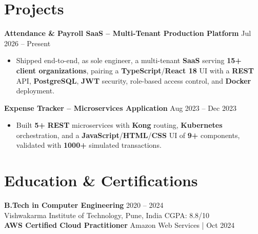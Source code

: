 \documentclass[a4paper,10pt]{article}
\begin{document}
\section*{Projects}

\textbf{Attendance \& Payroll SaaS -- Multi-Tenant Production Platform} \hfill Jul 2026 -- Present
\begin{itemize}[leftmargin=*]
    \item Shipped end-to-end, as sole engineer, a multi-tenant \textbf{SaaS} serving \textbf{15+ client organizations}, pairing a \textbf{TypeScript}/\textbf{React 18} UI with a \textbf{REST} API, \textbf{PostgreSQL}, \textbf{JWT} security, role-based access control, and \textbf{Docker} deployment.
\end{itemize}

\textbf{Expense Tracker -- Microservices Application} \hfill Aug 2023 -- Dec 2023
\begin{itemize}[leftmargin=*]
    \item Built \textbf{5+} \textbf{REST} microservices with \textbf{Kong} routing, \textbf{Kubernetes} orchestration, and a \textbf{JavaScript}/\textbf{HTML}/\textbf{CSS} UI of \textbf{9+} components, validated with \textbf{1000+} simulated transactions.
\end{itemize}

\section*{Education \& Certifications}
\textbf{B.Tech in Computer Engineering} \hfill 2020 -- 2024 \\
Vishwakarma Institute of Technology, Pune, India \hfill CGPA: 8.8/10 \\
\textbf{AWS Certified Cloud Practitioner} \hfill Amazon Web Services \;|\; Oct 2024
\end{document}
